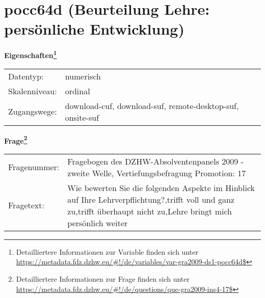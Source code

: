 
    \setcounter{footnote}{0}

    \vspace*{-1.8cm}
	\section{pocc64d (Beurteilung Lehre: persönliche Entwicklung)}
	\label{section:pocc64d}



    \vspace*{0.5cm}
    \noindent\textbf{Eigenschaften\footnote{Detailliertere Informationen zur Variable finden sich unter
		\url{https://metadata.fdz.dzhw.eu/\#!/de/variables/var-gra2009-ds1-pocc64d$}}}\\
	\begin{tabularx}{\hsize}{@{}lX}
	Datentyp: & numerisch \\
	Skalenniveau: & ordinal \\
	Zugangswege: &
	  download-cuf, 
	  download-suf, 
	  remote-desktop-suf, 
	  onsite-suf
 \\
    \end{tabularx}



				\vspace*{0.5cm}
                \noindent\textbf{Frage\footnote{Detailliertere Informationen zur Frage finden sich unter
		              \url{https://metadata.fdz.dzhw.eu/\#!/de/questions/que-gra2009-ins4-17$}}}\\
				\begin{tabularx}{\hsize}{@{}lX}
					Fragenummer: &
					  Fragebogen des DZHW-Absolventenpanels 2009 - zweite Welle, Vertiefungsbefragung Promotion:
					  17
 \\
					Fragetext: & Wie bewerten Sie die folgenden Aspekte im Hinblick auf Ihre Lehrverpflichtung?,trifft voll und ganz zu,trifft überhaupt nicht zu,Lehre bringt mich persönlich weiter \\
				\end{tabularx}





